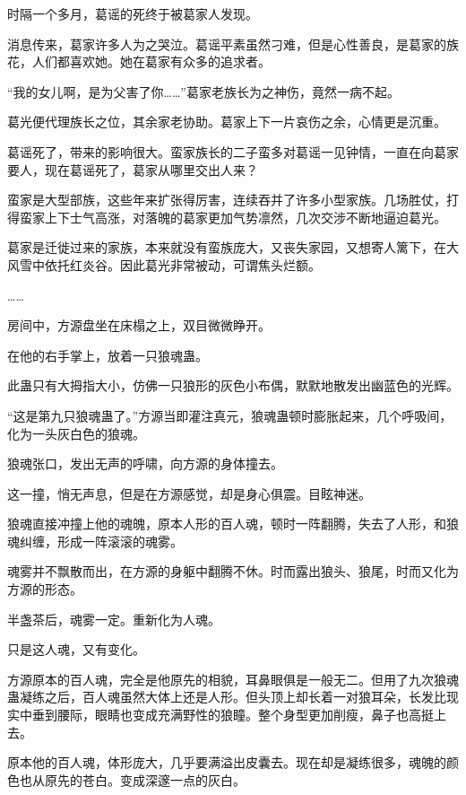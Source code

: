 
\begin{this_body}



时隔一个多月，葛谣的死终于被葛家人发现。

消息传来，葛家许多人为之哭泣。葛谣平素虽然刁难，但是心性善良，是葛家的族花，人们都喜欢她。她在葛家有众多的追求者。

“我的女儿啊，是为父害了你……”葛家老族长为之神伤，竟然一病不起。

葛光便代理族长之位，其余家老协助。葛家上下一片哀伤之余，心情更是沉重。

葛谣死了，带来的影响很大。蛮家族长的二子蛮多对葛谣一见钟情，一直在向葛家要人，现在葛谣死了，葛家从哪里交出人来？

蛮家是大型部族，这些年来扩张得厉害，连续吞并了许多小型家族。几场胜仗，打得蛮家上下士气高涨，对落魄的葛家更加气势凛然，几次交涉不断地逼迫葛光。

葛家是迁徙过来的家族，本来就没有蛮族庞大，又丧失家园，又想寄人篱下，在大风雪中依托红炎谷。因此葛光非常被动，可谓焦头烂额。

……

房间中，方源盘坐在床榻之上，双目微微睁开。

在他的右手掌上，放着一只狼魂蛊。

此蛊只有大拇指大小，仿佛一只狼形的灰色小布偶，默默地散发出幽蓝色的光辉。

“这是第九只狼魂蛊了。”方源当即灌注真元，狼魂蛊顿时膨胀起来，几个呼吸间，化为一头灰白色的狼魂。

狼魂张口，发出无声的呼啸，向方源的身体撞去。

这一撞，悄无声息，但是在方源感觉，却是身心俱震。目眩神迷。

狼魂直接冲撞上他的魂魄，原本人形的百人魂，顿时一阵翻腾，失去了人形，和狼魂纠缠，形成一阵滚滚的魂雾。

魂雾并不飘散而出，在方源的身躯中翻腾不休。时而露出狼头、狼尾，时而又化为方源的形态。

半盏茶后，魂雾一定。重新化为人魂。

只是这人魂，又有变化。

方源原本的百人魂，完全是他原先的相貌，耳鼻眼俱是一般无二。但用了九次狼魂蛊凝练之后，百人魂虽然大体上还是人形。但头顶上却长着一对狼耳朵，长发比现实中垂到腰际，眼睛也变成充满野性的狼瞳。整个身型更加削瘦，鼻子也高挺上去。

原本他的百人魂，体形庞大，几乎要满溢出皮囊去。现在却是凝练很多，魂魄的颜色也从原先的苍白。变成深邃一点的灰白。


\end{this_body}
